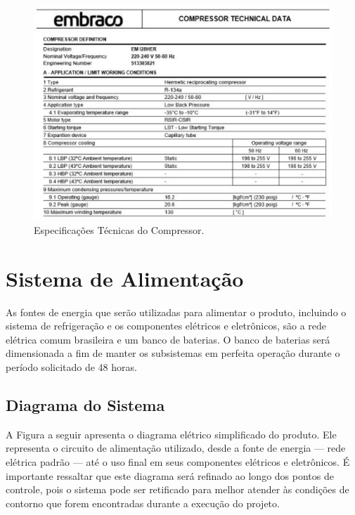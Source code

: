 	 	 	\begin{figure}[H]
	 	 		\begin{center}
	 	 			\includegraphics[scale =1]{figuras/caracteristicas}
	 	 			\caption{Especificações Técnicas do Compressor.
	 	 				 }
	 	 		\end{center}
	 	 	\end{figure}
	 	
\section{Sistema de Alimentação}
As fontes de energia que serão utilizadas para alimentar o produto, incluindo o sistema de refrigeração e os componentes elétricos e eletrônicos, são a rede elétrica comum brasileira e um banco de baterias. O banco de baterias será dimensionada a fim de manter os subsistemas em perfeita operação durante o período solicitado de 48 horas.

\subsection{Diagrama do Sistema}
A Figura a seguir apresenta o diagrama elétrico simplificado do produto. Ele representa o circuito de alimentação utilizado, desde a fonte de energia --- rede elétrica padrão --- até o uso final em seus componentes elétricos e eletrônicos.  É importante ressaltar que este diagrama será refinado ao longo dos pontos de controle, pois o  sistema pode ser retificado para melhor atender às condições de contorno que forem encontradas durante a execução do projeto.

